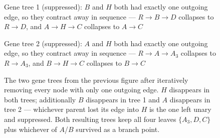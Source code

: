 \begin{figure}[h]
\centering
\begin{minipage}{0.48\textwidth}
\centering
{}

\small Gene tree 1 (suppressed): $B$ and $H$ both had exactly one outgoing edge, so they contract away in sequence --- $R\!\to\!B\!\to\!D$ collapses to $R\!\to\!D$, and $A\!\to\!H\!\to\!C$ collapses to $A\!\to\!C$
\end{minipage}
\hfill
\begin{minipage}{0.48\textwidth}
\centering
{}

\small Gene tree 2 (suppressed): $A$ and $H$ both had exactly one outgoing edge, so they contract away in sequence --- $R\!\to\!A\!\to\!A_3$ collapses to $R\!\to\!A_3$, and $B\!\to\!H\!\to\!C$ collapses to $B\!\to\!C$
\end{minipage}
\caption{The two gene trees from the previous figure after iteratively removing every node with only one outgoing edge. $H$ disappears in both trees; additionally $B$ disappears in tree 1 and $A$ disappears in tree 2 --- whichever parent lost its edge into $H$ is the one left unary and suppressed. Both resulting trees keep all four leaves $\{A_3, D, C\}$ plus whichever of $A$/$B$ survived as a branch point.}
\end{figure}

